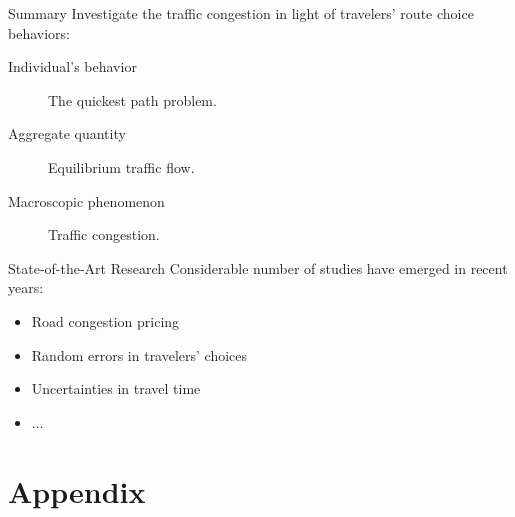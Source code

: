 \documentclass[handout]{beamer}
\begin{document}
\begin{frame}{Summary}
Investigate the traffic congestion in light of travelers' route choice behaviors: 
\begin{description}
	\item[Individual's behavior] The quickest path problem.
	\item[Aggregate quantity] Equilibrium traffic flow. 
	\item[Macroscopic phenomenon] Traffic congestion. 
\end{description}

  
\end{frame}

\begin{frame}{State-of-the-Art Research}
Considerable number of studies have emerged in recent years: 
\begin{itemize}
	\item Road congestion pricing
	\item Random errors in travelers' choices
	\item Uncertainties in travel time
	\item $\dots$
\end{itemize}
\end{frame}

\appendix
%
%

\section*{Appendix}
\end{document}
